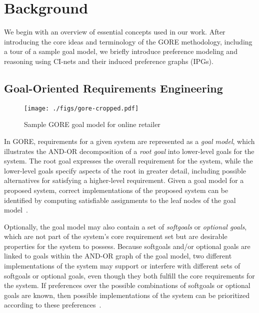 \section{Background}
\label{sec:background}

We begin with an overview of essential concepts used in our work. After introducing the core ideas and terminology of the GORE methodology, including a tour of a sample goal model, we briefly introduce preference modeling and reasoning using CI-nets and their induced preference graphs (IPGs). 

\subsection{Goal-Oriented Requirements Engineering}
\label{sec:gore}

\begin{figure}%
\centering
\texttt{[image: ./figs/gore-cropped.pdf]}%
\caption{Sample GORE goal model for online retailer}%
\label{fig:goal-model}%
\end{figure}

In GORE, requirements for a given system are represented as a \emph{goal model}, which illustrates the AND-OR decomposition of a \emph{root goal} into lower-level goals for the system. The root goal expresses the overall requirement for the system, while the lower-level goals specify aspects of the root in greater detail, including possible alternatives for satisfying a higher-level requirement. Given a goal model for a proposed system, correct implementations of the proposed system can be identified by computing satisfiable assignments to the leaf nodes of the goal model~\cite{Mylopoulos:CAiSE04}. 

Optionally, the goal model may also contain a set of \emph{softgoals} or \emph{optional goals}, which are not part of the system's core requirement set but are desirable properties for the system to possess. Because softgoals and/or optional goals are linked to goals within the AND-OR graph of the goal model, two different implementations of the system may support or interfere with different sets of softgoals or optional goals, even though they both fulfill the core requirements for the system. If preferences over the possible combinations of softgoals or optional goals are known, then possible implementations of the system can be prioritized according to these preferences~\cite{Liaskos:RE10}. 


